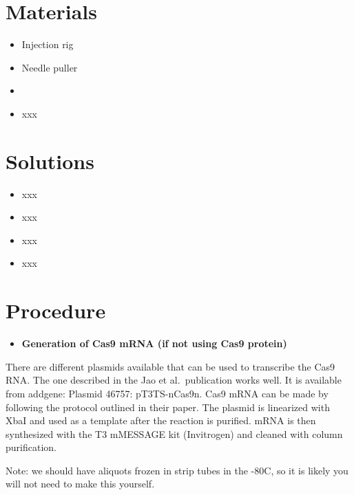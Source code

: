 \documentclass[
  letterpaper,
  DIV=11,
  numbers=noendperiod]{scrreprt}
\providecommand{\tightlist}{%
  \setlength{\itemsep}{0pt}\setlength{\parskip}{0pt}}\usepackage{longtable,booktabs,array}
\begin{document}
\hypertarget{materials-86}{%
\section{Materials}\label{materials-86}}

\begin{itemize}
\tightlist
\item
  Injection rig
\item
  Needle puller
\item
\item
  xxx
\end{itemize}

\hypertarget{solutions-78}{%
\section{Solutions}\label{solutions-78}}

\begin{itemize}
\tightlist
\item
  xxx
\item
  xxx
\item
  xxx
\item
  xxx
\end{itemize}

\hypertarget{procedure-86}{%
\section{Procedure}\label{procedure-86}}

\begin{itemize}
\tightlist
\item
  \textbf{Generation of Cas9 mRNA (if not using Cas9 protein)}
\end{itemize}

\begin{tcolorbox}[enhanced jigsaw, toprule=.15mm, breakable, coltitle=black, leftrule=.75mm, title=\textcolor{quarto-callout-note-color}{\faInfo}\hspace{0.5em}{Note}, bottomrule=.15mm, toptitle=1mm, bottomtitle=1mm, colframe=quarto-callout-note-color-frame, opacityback=0, colback=white, opacitybacktitle=0.6, colbacktitle=quarto-callout-note-color!10!white, rightrule=.15mm, titlerule=0mm, arc=.35mm, left=2mm]

There are different plasmids available that can be used to transcribe
the Cas9 RNA. The one described in the Jao et al.~publication works
well. It is available from addgene: Plasmid 46757: pT3TS-nCas9n. Cas9
mRNA can be made by following the protocol outlined in their paper. The
plasmid is linearized with XbaI and used as a template after the
reaction is purified. mRNA is then synthesized with the T3 mMESSAGE kit
(Invitrogen) and cleaned with column purification.

Note: we should have aliquots frozen in strip tubes in the -80C, so it
is likely you will not need to make this yourself.

\end{tcolorbox}
\end{document}
